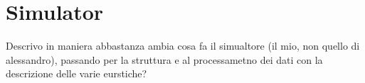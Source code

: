 
\chapter{Simulator}
\label{chap:5_simulator}
	\graphicspath{{Chapter5/}}


Descrivo in maniera abbastanza ambia cosa fa il simualtore (il mio, non quello di alessandro), passando per la struttura e al processametno dei dati con la descrizione delle varie eurstiche?

